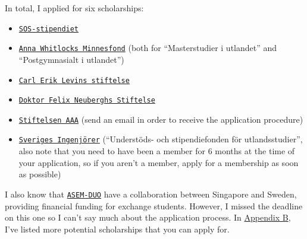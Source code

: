 In total, I applied for six scholarships:
\begin{itemize}
    \item \href{https://www.globalgrant.com/sos-stipendier}{\texttt{SOS-stipendiet}}
    \item \href{https://www.whitlocks.se/anna-whitlock/}{\texttt{Anna Whitlocks Minnesfond}} (both for ``Masterstudier i utlandet'' and ``Postgymnasialt i utlandet'')
    \item \href{https://www.stiftelseansokan.se/Pages/Levin.aspx}{\texttt{Carl Erik Levins stiftelse}}
    \item \href{https://www.felixneubergh.se}{\texttt{Doktor Felix Neuberghs Stiftelse}}
    \item \href{http://stipendieguiden.com/listing/stiftelsen-aaa/}{\texttt{Stiftelsen AAA}} (send an email in order to receive the application procedure)
    \item \href{https://www.sverigesingenjorer.se/medlemskap/stipendier/}{\texttt{Sveriges Ingenjörer}} (``Understöds- och stipendiefonden för utlandsstudier'', also note that you need to have been a member for 6 months at the time of your application, so if you aren't a member, apply for a membership as soon as possible)
\end{itemize}
I also know that \href{https://www.asemduo.org/02_programs/programs_02.php}{\texttt{ASEM-DUO}} have a collaboration between Singapore and Sweden, providing financial funding for exchange students. However, I missed the deadline on this one so I can't say much about the application process. In \hyperref[appB]{Appendix B}, I've listed more potential scholarships that you can apply for.
